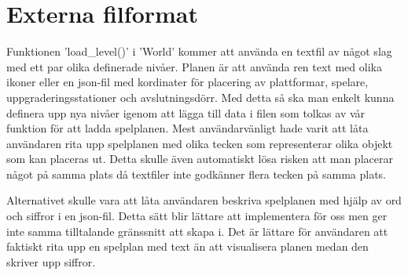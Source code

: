 \documentclass{TDP005mall}
\begin{document}
\section{Externa filformat} 
Funktionen 'load\_level()' i 'World' kommer att använda en textfil av något slag med ett par olika definerade nivåer. Planen är att använda ren text med olika ikoner eller en json-fil med kordinater för placering av plattformar, spelare, uppgraderingsstationer och avslutningsdörr. Med detta så ska man enkelt kunna definera upp nya nivåer igenom att lägga till data i filen som tolkas av vår funktion för att ladda spelplanen. Mest användarvänligt hade varit att låta användaren rita upp spelplanen med olika tecken som representerar olika objekt som kan placeras ut. Detta skulle även automatiskt lösa risken att man placerar något på samma plats då textfiler inte godkänner flera tecken på samma plats.

Alternativet skulle vara att låta användaren beskriva spelplanen med hjälp av ord och siffror i en json-fil. Detta sätt blir lättare att implementera för oss men ger inte samma tilltalande gränssnitt att skapa i. Det är lättare för användaren att faktiskt rita upp en spelplan med text än att visualisera planen medan den skriver upp siffror.
\end{document}
